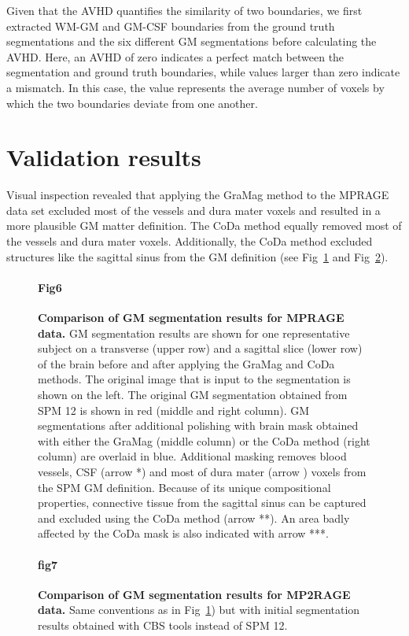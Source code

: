Given that the AVHD quantifies the similarity of two boundaries, we first extracted WM-GM and GM-CSF boundaries from the ground truth segmentations and the six different GM segmentations before calculating the AVHD. Here, an AVHD of zero indicates a perfect match between the segmentation and ground truth boundaries, while values larger than zero indicate a mismatch. In this case, the value represents the average number of voxels by which the two boundaries deviate from one another.

\section{Validation results} \label{ValidationResults}
Visual inspection revealed that applying the GraMag method to the MPRAGE data set excluded most of the vessels and dura mater voxels and resulted in a more plausible GM matter definition. The CoDa method equally removed most of the vessels and dura mater voxels. Additionally, the CoDa method excluded structures like the sagittal sinus from the GM definition (see Fig~\ref{Fig6} and Fig~\ref{fig7}).


\begin{figure}[!ht]
\paragraph{Fig6}
\caption{{\bf Comparison of GM segmentation results for MPRAGE data.} GM segmentation results are shown for one representative subject on a transverse (upper row) and a sagittal slice (lower row) of the brain before and after applying the GraMag and CoDa methods. The original image that is input to the segmentation is shown on the left. The original GM segmentation obtained from SPM 12 is shown in red (middle and right column). GM segmentations after additional polishing with brain mask obtained with either the GraMag (middle column) or the CoDa method (right column) are overlaid in blue. Additional masking removes blood vessels, CSF (arrow *) and most of dura mater (arrow \dag) voxels from the SPM GM definition. Because of its unique compositional properties, connective tissue from the sagittal sinus can be captured and excluded using the CoDa method (arrow **). An area badly affected by the CoDa mask is also indicated with arrow ***.}
\label{Fig6}
\end{figure}

\begin{figure}[!ht]
\paragraph{fig7}
\caption{{\bf Comparison of GM segmentation results for MP2RAGE data.} Same conventions as in Fig~\ref{Fig6}) but with initial segmentation results obtained with CBS tools instead of SPM 12.}
\label{fig7}
\end{figure}

